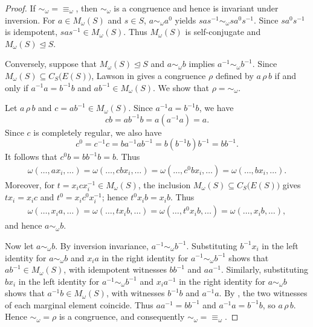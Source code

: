\documentclass[11pt,a4paper,reqno]{amsart}
\newcommand{\cent}[1]{C_{#1}\bigl(E(#1)\bigr)}
\numberwithin{equation}{section}
\begin{document}
\begin{proof}
If $\sim_\omega=\equiv_\omega$, then $\sim_\omega$ is a congruence and hence is invariant under inversion. For $a\in M_\omega(S)$ and $s\in S$, $a\sim_\omega a^0$ yields $sas^{-1}\sim_\omega sa^0s^{-1}$. Since $sa^0s^{-1}$ is idempotent, $sas^{-1}\in M_\omega(S)$. Thus $M_\omega(S)$ is self-conjugate and $M_\omega(S)\trianglelefteq S$.

Conversely, suppose that $M_\omega(S)\trianglelefteq S$ and $a\sim_\omega b$ implies $a^{-1}\sim_\omega b^{-1}$. Since $M_\omega(S)\subseteq\cent S$, Lawson in
\cite[Theorem~4.8]{LawsonPrimer} gives a congruence $\rho$ defined by $a\,\rho\,b$ if and only if $a^{-1}a=b^{-1}b$ and $ab^{-1}\in M_\omega(S)$. We show that $\rho=\sim_\omega$.

Let $a\,\rho\,b$ and $c=ab^{-1}\in M_\omega(S)$. Since $a^{-1}a=b^{-1}b$, we have
\[
cb=ab^{-1}b=a(a^{-1}a)=a.
\]
Since $c$ is completely regular, we also have
\[
c^0=c^{-1}c =ba^{-1}ab^{-1} =b(b^{-1}b)b^{-1} =bb^{-1}.
\]
It follows that $c^0b=bb^{-1}b=b$. Thus
\[
\begin{aligned}
\omega(\ldots,ax_i,\ldots) =\omega(\ldots,cbx_i,\ldots) =\omega(\ldots,c^0bx_i,\ldots) =\omega(\ldots,bx_i,\ldots).
\end{aligned}
\]
Moreover, for $t=x_icx_i^{-1}\in M_\omega(S)$, the inclusion $M_\omega(S)\subseteq\cent S$ gives $tx_i=x_ic$ and $t^0=x_ic^0x_i^{-1}$; hence $t^0x_ib=x_ib$. Thus
\[
\begin{aligned}
\omega(\ldots,x_ia,\ldots) =\omega(\ldots,tx_ib,\ldots) =\omega(\ldots,t^0x_ib,\ldots) = \omega(\ldots,x_ib,\ldots),
\end{aligned}
\]
and hence $a\sim_\omega b$.

Now let $a\sim_\omega b$. By inversion invariance, $a^{-1}\sim_\omega b^{-1}$. Substituting $b^{-1}x_i$ in the left identity for $a\sim_\omega b$ and $x_ia$ in the right identity for $a^{-1}\sim_\omega b^{-1}$ shows that $ab^{-1}\in M_\omega(S)$, with idempotent witnesses $bb^{-1}$ and $aa^{-1}$. Similarly, substituting $bx_i$ in the left identity for $a^{-1}\sim_\omega b^{-1}$ and $x_ia^{-1}$ in the right identity for $a\sim_\omega b$ shows that $a^{-1}b\in M_\omega(S)$, with witnesses $b^{-1}b$ and $a^{-1}a$. By \cite[Lemma~4]{AAK}, the two witnesses of each marginal element coincide. Thus $aa^{-1}=bb^{-1}$ and $a^{-1}a=b^{-1}b$, so $a\,\rho\,b$. Hence
$\sim_\omega=\rho$ is a congruence, and consequently $\sim_\omega=\equiv_\omega$.
\end{proof}
\end{document}
